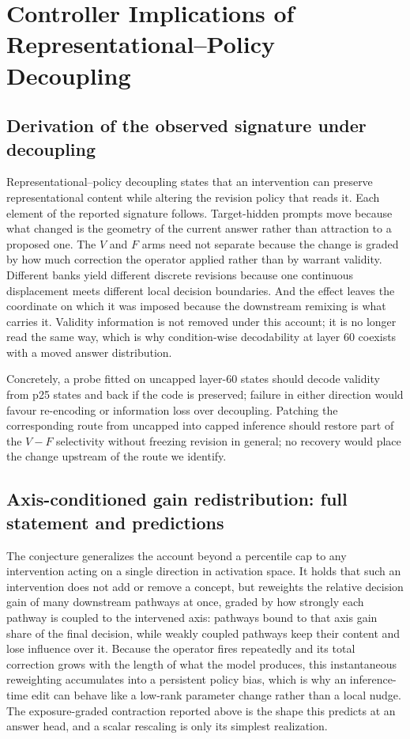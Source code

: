 \documentclass[letterpaper]{article}
\begin{document}
\section{Controller Implications of Representational--Policy Decoupling}
\label{supp:controller}

\subsection{Derivation of the observed signature under decoupling}

Representational--policy decoupling states that an intervention can preserve representational content while altering the revision policy that reads it. Each element of the reported signature follows. Target-hidden prompts move because what changed is the geometry of the current answer rather than attraction to a proposed one. The $V$ and $F$ arms need not separate because the change is graded by how much correction the operator applied rather than by warrant validity. Different banks yield different discrete revisions because one continuous displacement meets different local decision boundaries. And the effect leaves the coordinate on which it was imposed because the downstream remixing is what carries it. Validity information is not removed under this account; it is no longer read the same way, which is why condition-wise decodability at layer 60 coexists with a moved answer distribution.

Concretely, a probe fitted on uncapped layer-60 states should decode validity from p25 states and back if the code is preserved; failure in either direction would favour re-encoding or information loss over decoupling. Patching the corresponding route from uncapped into capped inference should restore part of the $V-F$ selectivity without freezing revision in general; no recovery would place the change upstream of the route we identify.

\subsection{Axis-conditioned gain redistribution: full statement and predictions}

The conjecture generalizes the account beyond a percentile cap to any intervention acting on a single direction in activation space. It holds that such an intervention does not add or remove a concept, but reweights the relative decision gain of many downstream pathways at once, graded by how strongly each pathway is coupled to the intervened axis: pathways bound to that axis gain share of the final decision, while weakly coupled pathways keep their content and lose influence over it. Because the operator fires repeatedly and its total correction grows with the length of what the model produces, this instantaneous reweighting accumulates into a persistent policy bias, which is why an inference-time edit can behave like a low-rank parameter change rather than a local nudge. The exposure-graded contraction reported above is the shape this predicts at an answer head, and a scalar rescaling is only its simplest realization.
\end{document}
